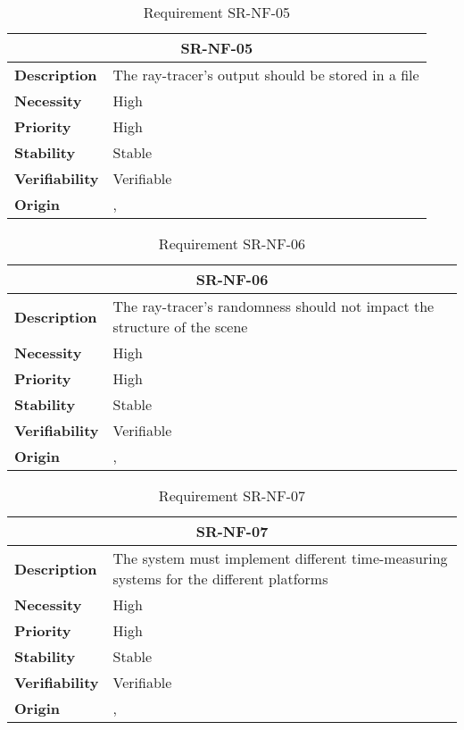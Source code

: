\begin{table}[H]
    \centering
    \begin{tabular}{l p{10cm}}
        \toprule
        \multicolumn{2}{c}{SR-NF-05} \\
        \toprule
        \textbf{Description}        & The ray-tracer's output should be stored in a file \\
        \textbf{Necessity}          &  High \\
        \textbf{Priority}           &  High \\
        \textbf{Stability}          &  Stable \\
        \textbf{Verifiability}      & Verifiable \\
        \textbf{Origin}             &  \textit{\nameref{tab:ur-ca-04}}, \textit{\nameref{tab:ur-ca-14}} \\
    \end{tabular}
    \caption{Requirement SR-NF-05}
    \label{tab:sr-nf-05}
\end{table}

\begin{table}[H]
    \centering
    \begin{tabular}{l p{10cm}}
        \toprule
        \multicolumn{2}{c}{SR-NF-06} \\
        \toprule
        \textbf{Description}        & The ray-tracer's randomness should not impact the structure of the scene \\
        \textbf{Necessity}          &  High \\
        \textbf{Priority}           &  High \\
        \textbf{Stability}          &  Stable \\
        \textbf{Verifiability}      & Verifiable \\
        \textbf{Origin}             & \textit{\nameref{tab:ur-ca-10}}, \textit{\nameref{tab:ur-ca-14}} \\
    \end{tabular}
    \caption{Requirement SR-NF-06}
    \label{tab:sr-nf-06}
\end{table}

\begin{table}[H]
    \centering
    \begin{tabular}{l p{10cm}}
        \toprule
        \multicolumn{2}{c}{SR-NF-07} \\
        \toprule
        \textbf{Description}        &  The system must implement different time-measuring systems for the different platforms\\
        \textbf{Necessity}          &  High \\
        \textbf{Priority}           &  High \\
        \textbf{Stability}          &  Stable \\
        \textbf{Verifiability}      & Verifiable \\
        \textbf{Origin}             & \textit{\nameref{tab:ur-ca-09}}, \textit{\nameref{tab:ur-ca-14}} \\
    \end{tabular}
    \caption{Requirement SR-NF-07}
    \label{tab:sr-nf-07}
\end{table}

